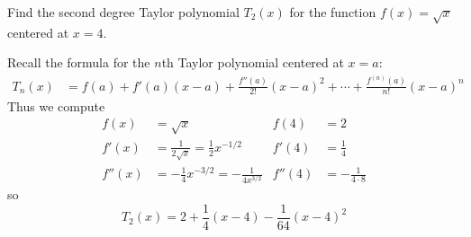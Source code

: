\documentclass[12pt,answers]{exam}
\begin{document}
\begin{questions}

\newpage
\question[12]
Find the second degree Taylor polynomial $T_2(x)$ for the function $f(x) = \sqrt{x}$ centered at $x = 4$.
\begin{solution}
    Recall the formula for the $n$th Taylor polynomial centered at $x=a$:
        \begin{align*}
            T_n(x) &= f(a) + f'(a) (x-a) + \frac{f''(a)}{2!} (x-a)^2 + \cdots + \frac{f^{(n)}(a)}{n!} (x-a)^n 
        \end{align*}
        Thus we compute
        \begin{align*}
            f(x) &= \sqrt x
           & f(4) &= 2 \\ 
           f'(x) &= \frac{1}{2\sqrt x} = \frac12 x^{-1/2}
           & f'(4) &= \frac{1}{4} \\ 
           f''(x) &= -\frac{1}{4}x^{-3/2} = -\frac{1}{4 x^{3/2}}
           & f''(4) &= -\frac{1}{4 \cdot 8}
        \end{align*}
        so
        \[
            T_2(x) = \boxed{2 + \frac14 (x-4) - \frac{1}{64}(x-4)^2}
        \]
\end{solution}

\newpage
\question
{}
\end{questions}
\end{document}
